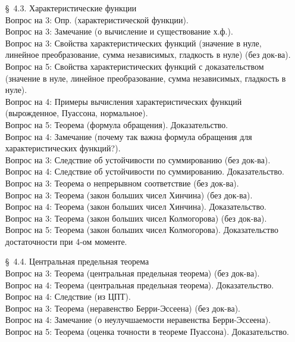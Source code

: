 \documentclass[10pt]{amsart}
\begin{document}
\begin{enumerate}
\begin{enumerate}
         
    
\item[\S\, 4.3.] Характеристические функции \\
Вопрос на 3: Опр. (характеристической функции). \\
Вопрос на 3: Замечание (о вычисление и существование х.ф.). \\
Вопрос на 3: Свойства характеристических функций (значение в нуле, линейное преобразование, сумма независимых, гладкость в нуле) (без док-ва). \\
Вопрос на 5: Свойства характеристических функций с доказательством (значение в нуле, линейное преобразование, сумма независимых, гладкость в нуле). \\
Вопрос на 4: Примеры вычисления характеристических функций (вырожденное, Пуассона, нормальное). \\
Вопрос на 5: Теорема (формула обращения). Доказательство. \\
Вопрос на 4: Замечание (почему так важна формула обращения для характеристических функций?). \\
Вопрос на 3: Следствие об устойчивости по суммированию (без док-ва). \\
Вопрос на 4: Следствие об устойчивости по суммированию. Доказательство. \\
Вопрос на 3: Теорема о непрерывном соответствие (без док-ва). \\
Вопрос на 3: Теорема (закон больших чисел Хинчина) (без док-ва). \\
Вопрос на 4:  Теорема (закон больших чисел Хинчина).  Доказательство. \\
Вопрос на 3: Теорема (закон больших чисел Колмогорова) (без док-ва). \\
Вопрос на 5: Теорема (закон больших чисел Колмогорова). Доказательство достаточности при 4-ом моменте. \\

 

\item[\S\, 4.4.] Центральная предельная теорема \\
Вопрос на 3: Теорема (центральная предельная теорема) (без док-ва). \\
Вопрос на 4: Теорема (центральная предельная теорема). Доказательство. \\        
Вопрос на 4: Следствие (из ЦПТ). \\
Вопрос на 3: Теорема (неравенство Берри-Эссеена) (без док-ва). \\
Вопрос на 4: Замечание (о неулучшаемости неравенства Берри-Эссеена). \\
Вопрос на 5: Теорема (оценка точности в теореме Пуассона). Доказательство. \\
    

\end{enumerate}
\end{enumerate}
\end{document}
